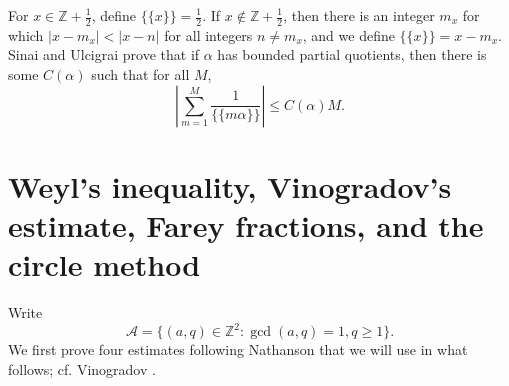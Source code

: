 \documentclass{amsart}
\begin{document}
For $x \in \mathbb{Z}+\frac{1}{2}$, define $\{\{x\}\}=\frac{1}{2}$. If $x \not \in \mathbb{Z}+\frac{1}{2}$, then there is 
an integer $m_x$ for which $|x-m_x| < |x-n|$ for all integers $n \neq m_x$, and we define $\{\{x\}\}=x-m_x$. 
Sinai and Ulcigrai \cite[p.~96, Proposition 2]{fixed} prove that if $\alpha$ has bounded partial quotients, then there is some
$C(\alpha)$ such that for all $M$,
\[
\left| \sum_{m=1}^M \frac{1}{\{\{m\alpha\}\}} \right| \leq C(\alpha)M.
\]






\section{Weyl's inequality, Vinogradov's estimate, Farey fractions, and the circle method}
Write
\[
\mathscr{A} = \{(a,q) \in \mathbb{Z}^2: \gcd(a,q)=1, q \geq 1\}.
\]
We first prove four estimates following Nathanson  \cite[pp.~104--110, Lemmas 4.8--4.11]{nathanson} that we will use in what follows; cf. Vinogradov \cite[p.~26, Chapter I,
Lemma 8b]{vinogradov}.
\end{document}
